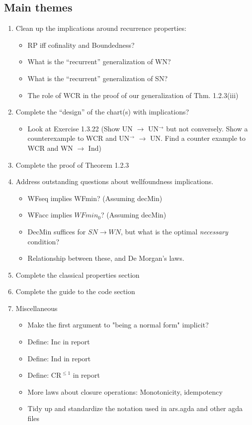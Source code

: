 \documentclass{scrartcl}
\begin{document}
\subsection{Main themes}
\begin{enumerate}
  \item Clean up the implications around recurrence properties:
  \begin{itemize}
    \item RP iff cofinality and Boundedness?
    \item What is the ``recurrent'' generalization of WN?
    \item What is the ``recurrent'' generalization of SN?
    \item The role of WCR in the proof of our generalization of Thm. 1.2.3(iii)
  \end{itemize}
  \item Complete the ``design'' of the chart(s) with implications?
  \begin{itemize}
    \item   Look at Exercise 1.3.22 (Show UN $\to$ UN$^\to$ but not conversely. Show a counterexample to WCR and UN$^\to$ $\to$ UN. Find a counter example to WCR and WN $\to$ Ind)
  \end{itemize}
  \item Complete the proof of Theorem 1.2.3
  \item Address outstanding questions about wellfoundness implications.
  \begin{itemize}
    \item WFseq implies WFmin? (Assuming decMin)
    \item WFacc implies $WFmin_0$? (Assuming decMin)
    \item DecMin suffices for $SN\to WN$, but what is the optimal \emph{necessary} condition?
    \item Relationship between these, and De Morgan's laws.
  \end{itemize}
  \item Complete the classical properties section
  \item Complete the guide to the code section
  \item Miscellaneous
  \begin{itemize}
    \item   Make the first argument to "being a normal form" implicit?
    \item   Define: Inc in report
    \item   Define: Ind in report 
    \item   Define: $\mathrm{CR}^{\le 1}$ in report
    \item   More laws about closure operations: Monotonicity, idempotency
    \item   Tidy up and standardize the notation used in ars.agda and other agda files


  \end{itemize}
\end{enumerate}
\end{document}
